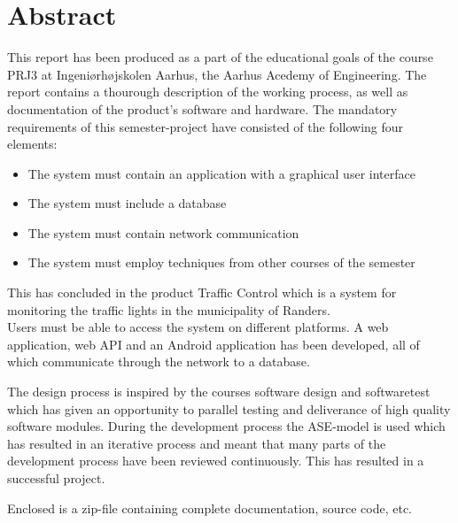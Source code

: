 {\let\clearpage\relax \chapter*{Abstract}}

This report has been produced as a part of the educational goals of the course PRJ3
at Ingeniørhøjskolen Aarhus, the Aarhus Acedemy of Engineering. The report contains a
thourough description of the working process, as well as documentation of the product's
software and hardware.
The mandatory requirements of this semester-project have consisted of the following four
elements:
\begin{itemize}
	\item The system must contain an application with a graphical user interface
	\item The system must include a database
	\item The system must contain network communication
	\item The system must employ techniques from other courses of the semester
\end{itemize}
This has concluded in the product Traffic Control which is a system for monitoring the traffic lights in the municipality of Randers. \\
Users must be able to access the system on different platforms.
A web application, web API and an Android application has been developed, all of which communicate through the network to a database.

The design process is inspired by the courses software design and softwaretest which has given an opportunity to parallel testing and deliverance of high quality software modules.
During the development process the ASE-model is used which has resulted in an iterative process and meant that many parts of the development process have been reviewed continuously. This has resulted in a successful project.

Enclosed is a zip-file containing complete documentation, source code, etc.


